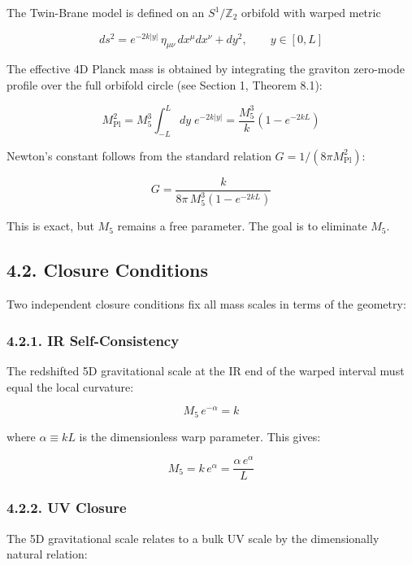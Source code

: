 \documentclass[
  11pt,
]{article}
\begin{document}
The Twin-Brane model is defined on an \(S^1/\mathbb{Z}_2\) orbifold with
warped metric

\[ds^2 = e^{-2k|y|}\,\eta_{\mu\nu}\,dx^\mu dx^\nu + dy^2, \qquad y \in [0, L] \tag{173}\]

The effective 4D Planck mass is obtained by integrating the graviton
zero-mode profile over the full orbifold circle (see Section 1, Theorem
8.1):

\[M_{\text{Pl}}^2 = M_5^3 \int_{-L}^{L} dy\;e^{-2k|y|} = \frac{M_5^3}{k}\left(1 - e^{-2kL}\right) \tag{174}\]

Newton's constant follows from the standard relation
\(G = 1/(8\pi M_{\text{Pl}}^2)\):

\[G = \frac{k}{8\pi\,M_5^3\left(1 - e^{-2kL}\right)} \tag{175}\]

This is exact, but \(M_5\) remains a free parameter. The goal is to
eliminate \(M_5\).

\bigskip

\hypertarget{closure-conditions}{%
\subsection{4.2. Closure Conditions}\label{closure-conditions}}

Two independent closure conditions fix all mass scales in terms of the
geometry:

\hypertarget{ir-self-consistency}{%
\subsubsection{4.2.1. IR Self-Consistency}\label{ir-self-consistency}}

The redshifted 5D gravitational scale at the IR end of the warped
interval must equal the local curvature:

\[M_5\,e^{-\alpha} = k \tag{176}\]

where \(\alpha \equiv kL\) is the dimensionless warp parameter. This
gives:

\[M_5 = k\,e^{\alpha} = \frac{\alpha\,e^{\alpha}}{L} \tag{177}\]

\hypertarget{uv-closure}{%
\subsubsection{4.2.2. UV Closure}\label{uv-closure}}

The 5D gravitational scale relates to a bulk UV scale by the
dimensionally natural relation:
\end{document}
